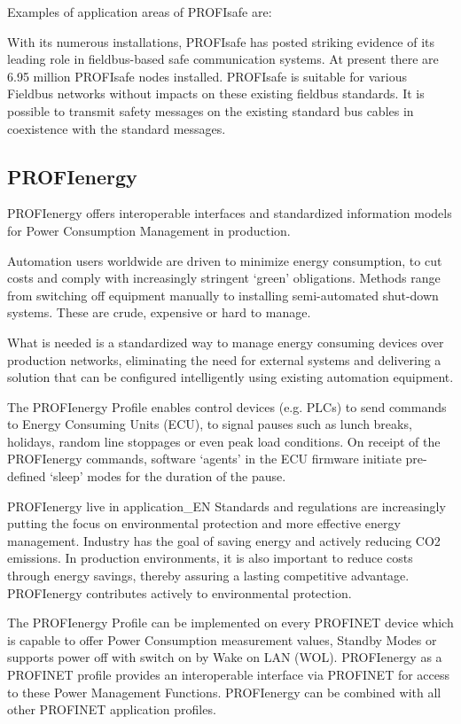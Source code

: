 \documentclass[conference]{IEEEtran}
\begin{document}
Examples of application areas of PROFIsafe are: 

With its numerous installations, PROFIsafe has posted striking evidence of its leading role in fieldbus-based safe communication systems. At present there are 6.95 million PROFIsafe nodes installed. PROFIsafe is suitable for various Fieldbus networks without impacts on these existing fieldbus standards. It is possible to transmit safety messages on the existing standard bus cables in coexistence with the standard messages.



\subsection{PROFIenergy}
\label{subsec: PROFIenergy}
PROFIenergy offers interoperable interfaces and standardized information models for Power Consumption Management in production.

Automation users worldwide are driven to minimize energy consumption, to cut costs and comply with increasingly stringent ‘green’ obligations. Methods range from switching off equipment manually to installing semi-automated shut-down systems. These are crude, expensive or hard to manage.

What is needed is a standardized way to manage energy consuming devices over production networks, eliminating the need for external systems and delivering a solution that can be configured intelligently using existing automation equipment.

The PROFIenergy Profile enables control devices (e.g. PLCs) to send commands to Energy Consuming Units (ECU), to signal pauses such as lunch breaks, holidays, random line stoppages or even peak load conditions. On receipt of the PROFIenergy commands, software ‘agents’ in the ECU firmware initiate pre-defined ‘sleep’ modes for the duration of the pause.

PROFIenergy live in application\_EN
Standards and regulations are increasingly putting the focus on environmental protection and more effective energy management. Industry has the goal of saving energy and actively reducing CO2 emissions. In production environments, it is also important to reduce costs through energy savings, thereby assuring a lasting competitive advantage.
PROFIenergy contributes actively to environmental protection.


The PROFIenergy Profile can be implemented on every PROFINET device which is capable to offer Power Consumption measurement values, Standby Modes or supports power off with switch on by Wake on LAN (WOL). PROFIenergy as a PROFINET profile provides an interoperable interface via PROFINET for access to these Power Management Functions. PROFIenergy can be combined with all other PROFINET application profiles. 
\end{document}
